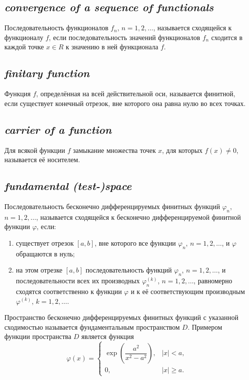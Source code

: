 \subsection*{ \textit{convergence of a sequence of functionals}}
\begin{rusblock}
Последовательность функционалов $f_n$, $n=1,2,\ldots$, называется сходящейся к функционалу $f$, если последовательность значений функционалов $f_n$ сходится в каждой точке $x\in R$ к значению в ней функционала $f$.
\end{rusblock}

\subsection*{ \textit{finitary function}}
\begin{rusblock}
Функция $f$, определённая на всей действительной оси, называется финитной, если существует конечный отрезок, вне которого она равна нулю во всех точках.
\end{rusblock}

\subsection*{ \textit{carrier of a function}}
\begin{rusblock}
Для всякой функции $f$ замыкание множества точек $x$, для которых $f(x)\ne0$, называется её носителем.
\end{rusblock}

\subsection*{ \textit{fundamental (test-)space}}
\begin{rusblock}
Последовательность бесконечно дифференцируемых финитных функций $\varphi_n$, $n=1,2,\ldots$, называется сходящейся к бесконечно дифференцируемой финитной функции $\varphi$, если:
\begin{enumerate}[leftmargin=2.2em]
\item существует отрезок $[a,b]$, вне которого все функции $\varphi_n$, $n=1,2,\ldots$, и $\varphi$ обращаются в нуль;
\item на этом отрезке $[a,b]$ последовательность функций $\varphi_n$, $n=1,2,\ldots$, и последовательности всех их производных $\varphi_n^{(k)}$, $n=1,2,\ldots$, равномерно сходятся соответственно к функции $\varphi$ и к её соответствующим производным $\varphi^{(k)}$, $k=1,2,\ldots$.
\end{enumerate}
Пространство бесконечно дифференцируемых финитных функций с указанной сходимостью называется фундаментальным пространством $D$. Примером функции пространства $D$ является функция
\[
\varphi(x)=
\begin{cases}
\exp\!\left(\dfrac{a^2}{x^2-a^2}\right),& |x|<a,\\[1.0ex]
0,& |x|\ge a.
\end{cases}
\]
\end{rusblock}

